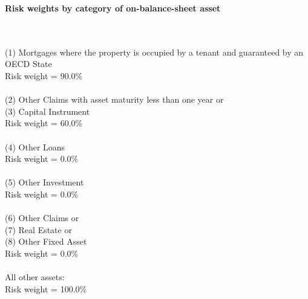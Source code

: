 \documentclass{article}
\begin{document}
\setlength{\parindent}{0em}
\begin{center}{\bf Risk weights by category of on-balance-sheet asset}\end{center}
~\\
~\\

(1) Mortgages where the property is occupied by a tenant and guaranteed by an OECD State\\
Risk weight = 90.0\%\\

~\\
(2) Other Claims with asset maturity less than one year or \\
(3) Capital Instrument \\
Risk weight = 60.0\%\\

~\\
(4) Other Loans\\
Risk weight = 0.0\%\\

~\\
(5) Other Investment\\
Risk weight = 0.0\%\\

~\\
(6) Other Claims or \\
(7) Real Estate or \\
(8) Other Fixed Asset\\
Risk weight = 0.0\%\\

~\\
All other assets:\\
Risk weight = 100.0\%\\

~\\
\end{document}
